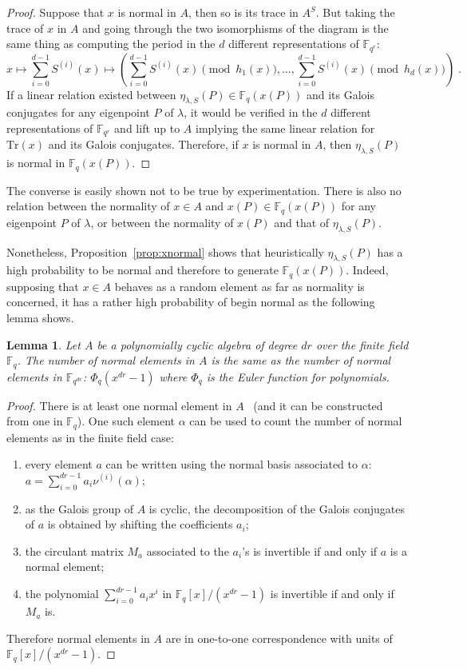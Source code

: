 \documentclass[12pt]{article}
\theoremstyle{plain}
\newtheorem{lemma}[theorem]{Lemma}
\theoremstyle{definition}
\def\F{\ensuremath{\mathbb{F}}}
\begin{document}
\begin{proof}
Suppose that $x$ is normal in $A$, then so is its trace in $A^S$.
But taking the trace of $x$ in $A$ and going through the two isomorphisms
of the diagram is the same thing as computing the period in the
$d$ different representations of $\F_{q^r}$:
\[
x \mapsto \sum_{i=0}^{d-1} S^{(i)}(x) \mapsto
\left( \sum_{i=0}^{d-1} S^{(i)}(x) \pmod{h_1(x)}, \ldots,
\sum_{i=0}^{d-1} S^{(i)}(x) \pmod{h_d(x)} \right) \; .
\]
If a linear relation existed between $\eta_{\lambda,S}(P) \in \F_q(x(P))$
and its Galois conjugates for any eigenpoint $P$ of $\lambda$,
it would be verified in the $d$ different representations of $\F_{q^r}$
and lift up to $A$ implying the same linear relation for
$\mathrm{Tr}(x)$ and its Galois conjugates.
Therefore, if $x$ is normal in $A$,
then $\eta_{\lambda,S}(P)$ is normal in $\F_q(x(P))$.
\end{proof}

The converse is easily shown not to be true by experimentation.
There is also no relation between the normality of $x \in A$
and $x(P) \in \F_q(x(P))$ for any eigenpoint $P$ of $\lambda$,
or between the normality of $x(P)$ and that of $\eta_{\lambda,S}(P)$.

Nonetheless, Proposition~\ref{prop:xnormal} shows that heuristically
$\eta_{\lambda,S}(P)$ has a high probability to be normal and therefore
to generate $\F_q(x(P))$.
Indeed, supposing that $x \in A$ behaves as a random element
as far as normality is concerned, it has a rather high probability
of begin normal as the following lemma shows.
\begin{lemma}
\label{lemma:euleralgebra}
Let $A$ be a polynomially cyclic algebra of degree $dr$
over the finite field $\F_q$.
The number of normal elements in $A$ is the same as the
number of normal elements in $\F_{q^{dr}}$:
$\Phi_q(x^{dr}-1)$ where $\Phi_q$ is the Euler function
for polynomials.
\end{lemma}
\begin{proof}
There is at least one normal element in $A$~\cite[Theorem 4]{Mihailescu2010825}
(and it can be constructed from one in $\F_q$).
One such element $\alpha$ can be used to count the number of normal elements
as in the finite field case:
\begin{enumerate}
\item every element $a$ can be written using the normal basis
associated to $\alpha$: $a = \sum_{i=0}^{dr-1} a_i \nu^{(i)}(\alpha)$;
\item as the Galois group of $A$ is cyclic, the decomposition
of the Galois conjugates of $a$ is obtained by shifting the coefficients $a_i$;
\item the circulant matrix $M_a$ associated to the $a_i$'s is invertible
if and only if $a$ is a normal element;
\item the polynomial $\sum_{i=0}^{dr-1} a_i x^i$ in $\F_q[x] / (x^{dr}-1)$
is invertible if and only if $M_a$ is.
\end{enumerate}
Therefore normal elements in $A$ are in one-to-one correspondence
with units of $\F_q[x] / (x^{dr}-1)$.
\end{proof}
\end{document}
